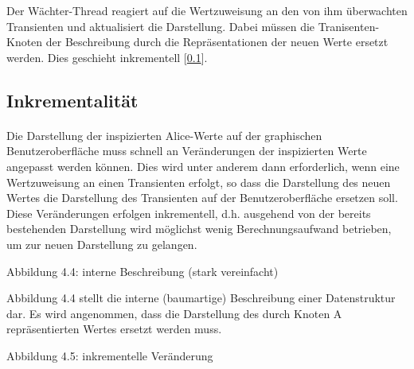 \documentclass[12pt,a4paper]{article}
\begin{document}
Der W\"achter-Thread reagiert auf die Wertzuweisung 
an den von ihm \"uberwachten Transienten und aktualisiert 
die Darstellung. Dabei m\"ussen die Tranisenten-Knoten 
der Beschreibung durch die Repr\"asentationen der neuen 
Werte ersetzt werden. Dies geschieht inkrementell [\ref{inkr}].


\subsection{Inkrementalit\"at}

\label{inkr} 

\paragraph{}

Die Darstellung der inspizierten Alice-Werte auf 
der graphischen Benutzeroberfl\"ache muss 
schnell an Ver\"anderungen der inspizierten 
Werte angepasst werden k\"onnen. Dies 
wird unter anderem dann erforderlich, wenn 
eine Wertzuweisung an einen Transienten 
erfolgt, so dass die Darstellung des 
neuen Wertes die Darstellung des Transienten 
auf der Benutzeroberfl\"ache ersetzen soll. 
Diese Ver\"anderungen erfolgen inkrementell, 
d.h. ausgehend von der bereits bestehenden 
Darstellung wird m\"oglichst wenig Berechnungsaufwand 
betrieben, um zur neuen Darstellung zu gelangen.

\begin{center}
\newline Abbildung 4.4: interne Beschreibung (stark vereinfacht)
\end{center} 

Abbildung 4.4 stellt die interne (baumartige) Beschreibung einer 
Datenstruktur dar. Es wird angenommen, dass die Darstellung 
des durch Knoten A repr\"{a}sentierten 
Wertes ersetzt werden muss.

\begin{center}
\newline Abbildung 4.5: inkrementelle Ver\"anderung 
\end{center}
\end{document}
